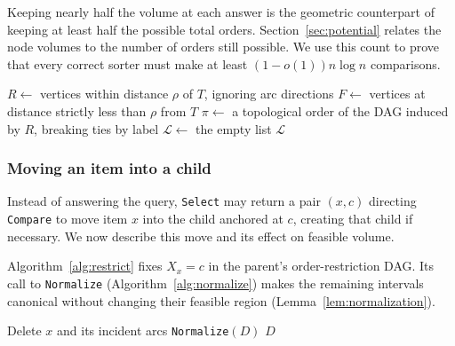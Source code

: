 Keeping nearly half the volume at each answer is the geometric counterpart
of keeping at least half the possible total orders.
Section~\ref{sec:potential} relates the node volumes to the number of
orders still possible. We use this count to prove that every correct
sorter must make at least $(1-o(1))n\log n$ comparisons.

\begin{algorithm}[H]
\caption{\texttt{Enclose}$(D,T)$: compute enclosing intervals for the queried coordinates.}
\label{alg:finite-digits}
\DontPrintSemicolon
{}
$R\gets$ vertices within distance $\rho$ of $T$, ignoring arc directions\;
$F\gets$ vertices at distance strictly less than $\rho$ from $T$\;
$\pi\gets$ a topological order of the DAG induced by $R$, breaking ties by label\;
$\mathcal L\gets$ the empty list\;
\Return $\mathcal L$\;
\end{algorithm}

\subsubsection{Moving an item into a child}\label{sec:overview-refine}

Instead of answering the query, \texttt{Select} may return a pair $(x,c)$
directing \texttt{Compare} to move item $x$ into the child anchored at $c$,
creating that child if necessary. We now describe this move and its effect
on feasible volume.

Algorithm~\ref{alg:restrict} fixes $X_x=c$ in the parent's order-restriction
DAG. Its call to \texttt{Normalize} (Algorithm~\ref{alg:normalize}) makes
the remaining intervals canonical without changing their feasible region
(Lemma~\ref{lem:normalization}).

\begin{algorithm}[H]
\caption{\texttt{Restrict}$(D,x,c)$: fix and remove a coordinate.}
\label{alg:restrict}
\DontPrintSemicolon
{}
Delete $x$ and its incident arcs\;
\texttt{Normalize}$(D)$\;
\Return $D$\;
\end{algorithm}

